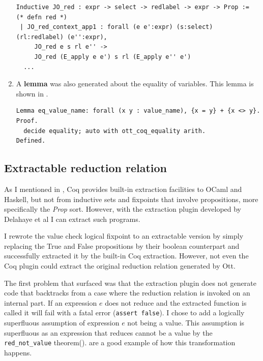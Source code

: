 \documentclass[12pt,twoside,notitlepage]{report}
\theoremstyle{plain}%
\theoremstyle{definition}
\theoremstyle{remark}
\begin{document}
\begin{enumerate}
{\begin{minipage}{\linewidth}

\begin{lstlisting}[language={Coq},caption={Coq reduction relation example}, label={lst:coqlogind}]
Inductive JO_red : expr -> select -> redlabel -> expr -> Prop :=    (* defn red *)
 | JO_red_context_app1 : forall (e e':expr) (s:select) (rl:redlabel) (e'':expr),
     JO_red e s rl e'' ->
     JO_red (E_apply e e') s rl (E_apply e'' e')
  ...
\end{lstlisting}

\end{minipage}	
}
\item{A \textbf{lemma} was also generated about the equality of variables. This lemma is shown in .


\begin{minipage}{\linewidth}

\begin{lstlisting}[language={Coq},caption={Coq variable equality lemma}, label={lst:coqeqlabel}]
Lemma eq_value_name: forall (x y : value_name), {x = y} + {x <> y}.
Proof.
  decide equality; auto with ott_coq_equality arith.
Defined.
\end{lstlisting}

\end{minipage}	

}
\end{enumerate} 
\subsection{Extractable reduction relation}
As I mentioned in , Coq provides built-in extraction facilities to OCaml and Haskell, but not from inductive sets and fixpoints that involve propositions, more specifically the \textit{Prop} sort. However, with the extraction plugin developed by Delahaye et al\cite{delahaye2007extracting,tollitte2012producing} I can extract such programs.

I rewrote the value check logical fixpoint to an extractable version by simply replacing the True and False propositions by their boolean counterpart and successfully extracted it by the built-in Coq extraction. However, not even the Coq plugin could extract the original reduction relation generated by Ott. 

The first problem that surfaced was that the extraction plugin does not generate code that backtracks from a case where the reduction relation is invoked on an internal part. If an expression $ e $ does not reduce and the extracted function is called it will fail with a fatal error (\lstinline|assert false|). I chose to add a logically superfluous assumption of expression $ e $ not being a value. This assumption is superfluous as an expression that reduces cannot be a value by the \lstinline[language={Coq}]|red_not_value| theorem().   are a good example of how this transformation happens. \vspace{4mm}
\end{document}

